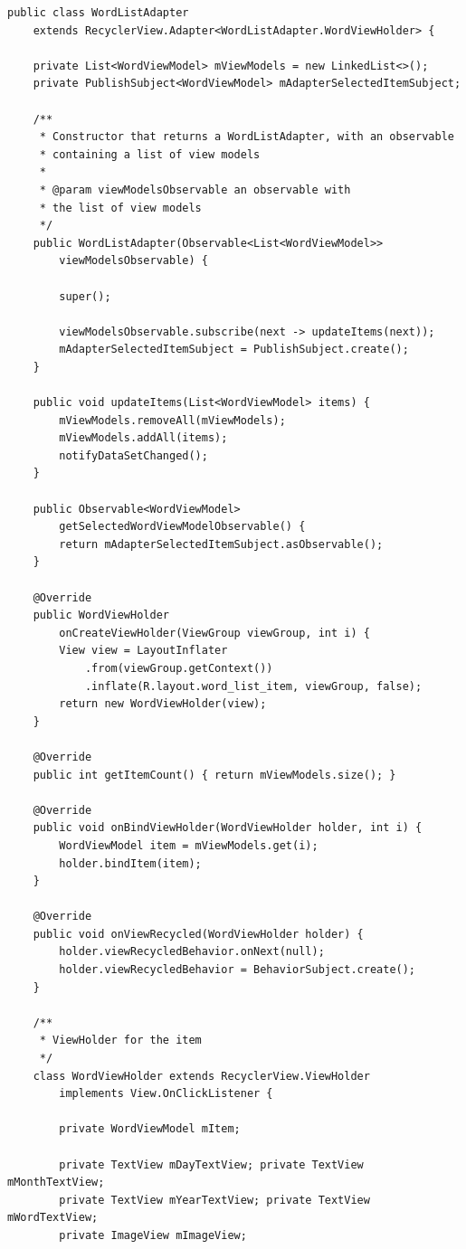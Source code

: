 \begin{verbatim}
public class WordListAdapter
    extends RecyclerView.Adapter<WordListAdapter.WordViewHolder> {

    private List<WordViewModel> mViewModels = new LinkedList<>();
    private PublishSubject<WordViewModel> mAdapterSelectedItemSubject;

    /**
     * Constructor that returns a WordListAdapter, with an observable
     * containing a list of view models
     *
     * @param viewModelsObservable an observable with 
     * the list of view models
     */
    public WordListAdapter(Observable<List<WordViewModel>> 
    	viewModelsObservable) {
    	
        super();

        viewModelsObservable.subscribe(next -> updateItems(next));
        mAdapterSelectedItemSubject = PublishSubject.create();
    }

    public void updateItems(List<WordViewModel> items) {
        mViewModels.removeAll(mViewModels);
        mViewModels.addAll(items);
        notifyDataSetChanged();
    }

    public Observable<WordViewModel> 
    	getSelectedWordViewModelObservable() {
        return mAdapterSelectedItemSubject.asObservable();
    }

    @Override
    public WordViewHolder 
    	onCreateViewHolder(ViewGroup viewGroup, int i) {
        View view = LayoutInflater
            .from(viewGroup.getContext())
            .inflate(R.layout.word_list_item, viewGroup, false);
        return new WordViewHolder(view);
    }

    @Override
    public int getItemCount() { return mViewModels.size(); }

    @Override
    public void onBindViewHolder(WordViewHolder holder, int i) {
        WordViewModel item = mViewModels.get(i);
        holder.bindItem(item);
    }

    @Override
    public void onViewRecycled(WordViewHolder holder) {
        holder.viewRecycledBehavior.onNext(null);
        holder.viewRecycledBehavior = BehaviorSubject.create();
    }

    /**
     * ViewHolder for the item
     */
    class WordViewHolder extends RecyclerView.ViewHolder
        implements View.OnClickListener {

        private WordViewModel mItem;

        private TextView mDayTextView; private TextView mMonthTextView;
        private TextView mYearTextView; private TextView mWordTextView;
        private ImageView mImageView;


\end{verbatim}
